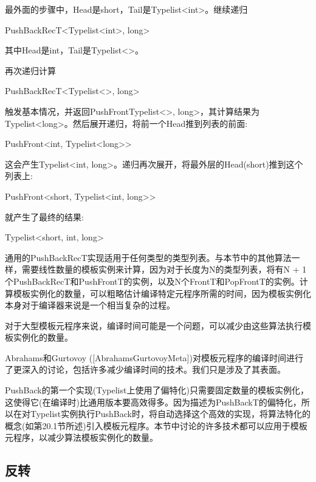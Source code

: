 最外面的步骤中，Head是short，Tail是Typelist<int>。继续递归

\begin{cpp}
PushBackRecT<Typelist<int>, long>
\end{cpp}

其中Head是int，Tail是Typelist<>。

再次递归计算

\begin{cpp}
PushBackRecT<Typelist<>, long>
\end{cpp}

触发基本情况，并返回PushFrontTypelist<>, long>，其计算结果为Typelist<long>。然后展开递归，将前一个Head推到列表的前面:

\begin{cpp}
PushFront<int, Typelist<long>>
\end{cpp}

这会产生Typelist<int, long>。递归再次展开，将最外层的Head(short)推到这个列表上:

\begin{cpp}
PushFront<short, Typelist<int, long>>
\end{cpp}

就产生了最终的结果:

\begin{cpp}
Typelist<short, int, long>
\end{cpp}

通用的PushBackRecT实现适用于任何类型的类型列表。与本节中的其他算法一样，需要线性数量的模板实例来计算，因为对于长度为N的类型列表，将有N + 1个PushBackRecT和PushFrontT的实例，以及N个FrontT和PopFrontT的实例。计算模板实例化的数量，可以粗略估计编译特定元程序所需的时间，因为模板实例化本身对于编译器来说是一个相当复杂的过程。

对于大型模板元程序来说，编译时间可能是一个问题，可以减少由这些算法执行模板实例化的数量。

\begin{notice}
Abrahams和Gurtovoy ([AbrahamsGurtovoyMeta])对模板元程序的编译时间进行了更深入的讨论，包括许多减少编译时间的技术。我们只是涉及了其表面。
\end{notice}

PushBack的第一个实现(Typelist上使用了偏特化)只需要固定数量的模板实例化，这使得它(在编译时)比通用版本要高效得多。因为描述为PushBackT的偏特化，所以在对Typelist实例执行PushBack时，将自动选择这个高效的实现，将算法特化的概念(如第20.1节所述)引入模板元程序。本节中讨论的许多技术都可以应用于模板元程序，以减少算法模板实例化的数量。

\subsection{反转}

